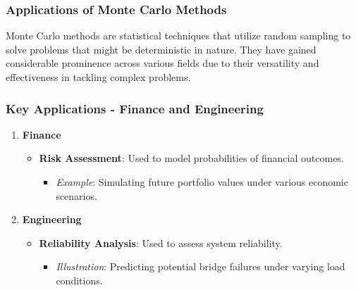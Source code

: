 \documentclass[aspectratio=169]{beamer}
\begin{document}
\begin{frame}
  \frametitle{Applications of Monte Carlo Methods}
  Monte Carlo methods are statistical techniques that utilize random sampling to solve problems that might be deterministic in nature. They have gained considerable prominence across various fields due to their versatility and effectiveness in tackling complex problems.
\end{frame}

\begin{frame}
  \frametitle{Key Applications - Finance and Engineering}
  \begin{enumerate}
    \item \textbf{Finance}
      \begin{itemize}
        \item \textbf{Risk Assessment}: Used to model probabilities of financial outcomes.
        \begin{itemize}
          \item \textit{Example}: Simulating future portfolio values under various economic scenarios.
        \end{itemize}
      \end{itemize}
    
    \item \textbf{Engineering}
      \begin{itemize}
        \item \textbf{Reliability Analysis}: Used to assess system reliability.
        \begin{itemize}
          \item \textit{Illustration}: Predicting potential bridge failures under varying load conditions.
        \end{itemize}
      \end{itemize}
  \end{enumerate}
\end{frame}
\end{document}
